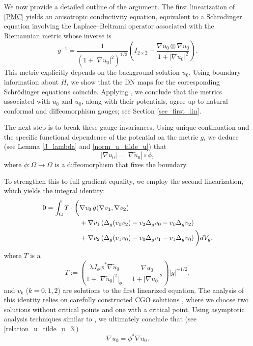 \documentclass[a4paper, 10pt, twoside, notitlepage]{amsart}
\theoremstyle{plain}
\numberwithin{equation}{section}
\newcommand{\abs}[1]{\lvert #1 \rvert}
\begin{document}
We now provide a detailed outline of the argument. The first linearization of \eqref{PMC} yields an anisotropic conductivity equation, equivalent to a Schrödinger equation involving the Laplace–Beltrami operator associated with the Riemannian metric whose inverse is
\begin{equation*}
    g^{-1} = \frac{1}{(1 + |\nabla u_0|^2)^{1/2}} \left( I_{2 \times 2} - \frac{\nabla u_0 \otimes \nabla u_0}{1 + |\nabla u_0|^2} \right).
\end{equation*}
This metric explicitly depends on the background solution $u_0$. Using boundary information about $H$, we show that the DN maps for the corresponding Schrödinger equations coincide. Applying \cite[Theorem 1.1]{carstea2024calderonproblemriemanniansurfaces}, we conclude that the metrics associated with $u_0$ and $\tilde{u}_0$, along with their potentials, agree up to natural conformal and diffeomorphism gauges; see Section \ref{sec_first_lin}.

The next step is to break these gauge invariances. Using unique continuation and the specific functional dependence of the potential on the metric $g$, we deduce (see Lemma \ref{J_lambda} and \eqref{norm_u_tilde_u}) that
\begin{equation}\label{eq:norm_nabla_u0}
    |\nabla u_0| = |\nabla \tilde{u}_0| \circ \phi,
\end{equation}
where $\phi: \Omega \to \Omega$ is a diffeomorphism that fixes the boundary.

To strengthen this to full gradient equality, we employ the second linearization, which yields the integral identity:
\begin{align}\label{eq:integral_identity}
    0 = \int_{\Omega} T \cdot \bigg( & \nabla v_0 \, g(\nabla v_1, \nabla v_2) \\
    & + \nabla v_1 \left( \Delta_g(v_0 v_2) - v_2 \Delta_g v_0 - v_0 \Delta_g v_2 \right) \notag \\
    & + \nabla v_2 \left( \Delta_g(v_1 v_0) - v_0 \Delta_g v_1 - v_1 \Delta_g v_0 \right) \bigg)  dV_g, \notag
\end{align}
where $T$ is a
\begin{equation*}
T:=\left(\frac{\lambda J_{\phi} \phi^*\nabla \tilde u_0}{1+\abs{\nabla \tilde u_0}^2|_{\phi}} - \frac{\nabla u_0}{1+\abs{\nabla u_0}^2}\right)\abs{g}^{-1/2},
\end{equation*}
and $v_k$ ($k=0,1,2$) are solutions to the first linearized equation. The analysis of this identity relies on carefully constructed CGO solutions \cite{guillarmou2011identification}, where we choose two solutions without critical points and one with a critical point. Using asymptotic analysis techniques similar to \cite{carstea2024calderonproblemriemanniansurfaces, liimatainen2023calder}, we ultimately conclude that (see \eqref{relation_u_tilde_u_3})
\begin{equation}\label{eq:gradient_equality}
    \nabla u_0 = \phi^* \nabla \tilde{u}_0.
\end{equation}
\end{document}
